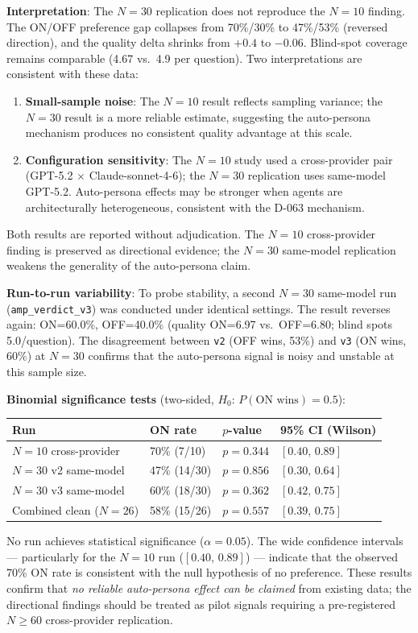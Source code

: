 \documentclass[12pt]{article}
\begin{document}
\noindent\textbf{Interpretation}: The $N=30$ replication does not reproduce the
$N=10$ finding. The ON/OFF preference gap collapses from 70\%/30\% to 47\%/53\%
(reversed direction), and the quality delta shrinks from $+0.4$ to $-0.06$.
Blind-spot coverage remains comparable (4.67 vs.\ 4.9 per question).
Two interpretations are consistent with these data:

\begin{enumerate}
  \item \textbf{Small-sample noise}: The $N=10$ result reflects sampling
        variance; the $N=30$ result is a more reliable estimate, suggesting the
        auto-persona mechanism produces no consistent quality advantage at this
        scale.
  \item \textbf{Configuration sensitivity}: The $N=10$ study used a cross-provider
        pair (GPT-5.2 $\times$ Claude-sonnet-4-6); the $N=30$ replication uses
        same-model GPT-5.2. Auto-persona effects may be stronger when agents
        are architecturally heterogeneous, consistent with the D-063 mechanism.
\end{enumerate}

\noindent Both results are reported without adjudication.
The $N=10$ cross-provider finding is preserved as directional evidence;
the $N=30$ same-model replication weakens the generality of the auto-persona
claim.

\medskip\noindent\textbf{Run-to-run variability}: To probe stability, a second $N=30$
same-model run (\texttt{amp\_verdict\_v3}) was conducted under identical settings.
The result reverses again: ON=60.0\%, OFF=40.0\% (quality ON=6.97 vs.\
OFF=6.80; blind spots 5.0/question). The disagreement between \texttt{v2}
(OFF wins, 53\%) and \texttt{v3} (ON wins, 60\%) at $N=30$ confirms that the
auto-persona signal is noisy and unstable at this sample size.

\medskip\noindent\textbf{Binomial significance tests} (two-sided, $H_0$: $P(\text{ON wins})=0.5$):
\begin{center}\small
\begin{tabular}{llll}
\toprule
Run & ON rate & $p$-value & 95\% CI (Wilson) \\
\midrule
$N=10$ cross-provider & 70\% (7/10) & $p=0.344$ & $[0.40,\,0.89]$ \\
$N=30$ v2 same-model  & 47\% (14/30) & $p=0.856$ & $[0.30,\,0.64]$ \\
$N=30$ v3 same-model  & 60\% (18/30) & $p=0.362$ & $[0.42,\,0.75]$ \\
Combined clean ($N=26$) & 58\% (15/26) & $p=0.557$ & $[0.39,\,0.75]$ \\
\bottomrule
\end{tabular}
\end{center}
\noindent No run achieves statistical significance ($\alpha=0.05$).
The wide confidence intervals --- particularly for the $N=10$ run
($[0.40,\,0.89]$) --- indicate that the observed 70\% ON rate is consistent
with the null hypothesis of no preference. These results confirm that
\emph{no reliable auto-persona effect can be claimed} from existing data;
the directional findings should be treated as pilot signals requiring a
pre-registered $N\geq60$ cross-provider replication.
\end{document}
